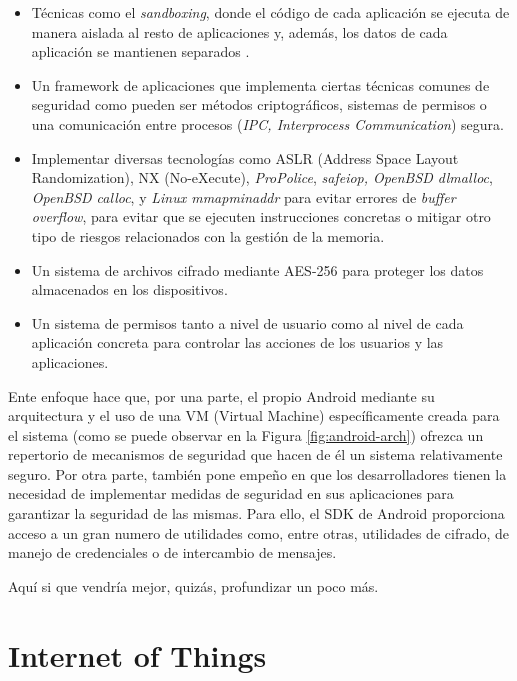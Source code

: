 \begin{itemize}
	\item Técnicas como el \emph{sandboxing}, donde el código de cada aplicación se ejecuta de manera aislada al resto de aplicaciones y, además, los datos de cada aplicación se mantienen separados \cite{jspdcp-2014}. 
	\item Un framework de aplicaciones que implementa ciertas técnicas comunes de seguridad como pueden ser métodos criptográficos, sistemas de permisos o una comunicación entre procesos (\textit{IPC, Interprocess Communication}) segura.	
	\item Implementar diversas tecnologías como ASLR (Address Space Layout Randomization), NX (No-eXecute), \textit{ProPolice}, \textit{safe\textunderscore iop, OpenBSD dlmalloc}, \textit{OpenBSD calloc}, y \textit{Linux mmap\textunderscore min\textunderscore addr} para evitar errores de \textit{buffer overflow}, para evitar que se ejecuten instrucciones concretas o mitigar otro tipo de riesgos relacionados con la gestión de la memoria.
	\item Un sistema de archivos cifrado mediante AES-256 para proteger los datos almacenados en los dispositivos.
	\item Un sistema de permisos tanto a nivel de usuario como al nivel de cada aplicación concreta para controlar las acciones de los usuarios y las aplicaciones.
\end{itemize}

Ente enfoque hace que, por una parte, el propio Android mediante su arquitectura y el uso de una VM (Virtual Machine) específicamente creada para el sistema (como se puede observar en la Figura \ref{fig:android-arch}) ofrezca un repertorio de mecanismos de seguridad que hacen de él un sistema relativamente seguro. Por otra parte, también pone empeño en que los desarrolladores tienen la necesidad de implementar medidas de seguridad en sus aplicaciones para garantizar la seguridad de las mismas. Para ello, el SDK de Android proporciona acceso a un gran numero de utilidades como, entre otras, utilidades de cifrado, de manejo de credenciales o de intercambio de mensajes.

{\color{red} Aquí si que vendría mejor, quizás, profundizar un poco más.}


\section{Internet of Things}

